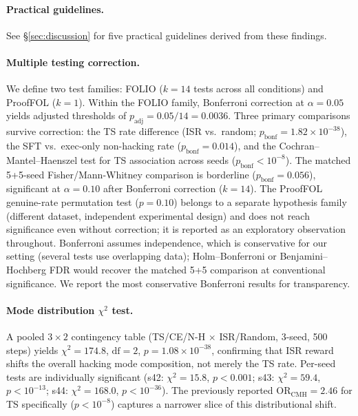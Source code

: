 \paragraph{Practical guidelines.}
\label{app:practical-guidelines}
See \S\ref{sec:discussion} for five practical guidelines derived from these findings.

\paragraph{Multiple testing correction.}
\label{app:statistical-details}
We define two test families: FOLIO ($k{=}14$ tests across all conditions) and ProofFOL ($k{=}1$).
Within the FOLIO family, Bonferroni correction at $\alpha{=}0.05$ yields adjusted thresholds of $p_{\text{adj}}{=}0.05/14{=}0.0036$.
Three primary comparisons survive correction: the TS rate difference (ISR vs.\ random; $p_{\text{bonf}}{=}1.82{\times}10^{-38}$), the SFT vs.\ exec-only non-hacking rate ($p_{\text{bonf}}{=}0.014$), and the Cochran--Mantel--Haenszel test for TS association across seeds ($p_{\text{bonf}}{<}10^{-8}$).
The matched 5+5-seed Fisher/Mann-Whitney comparison is borderline ($p_{\text{bonf}}{=}0.056$), significant at $\alpha{=}0.10$ after Bonferroni correction ($k{=}14$).
The ProofFOL genuine-rate permutation test ($p{=}0.10$) belongs to a separate hypothesis family (different dataset, independent experimental design) and does not reach significance even without correction; it is reported as an exploratory observation throughout.
Bonferroni assumes independence, which is conservative for our setting (several tests use overlapping data); Holm--Bonferroni or Benjamini--Hochberg FDR would recover the matched 5+5 comparison at conventional significance.
We report the most conservative Bonferroni results for transparency.

\paragraph{Mode distribution $\chi^2$ test.}
A pooled $3{\times}2$ contingency table (TS/CE/N-H $\times$ ISR/Random, 3-seed, 500 steps) yields $\chi^2{=}174.8$, $\text{df}{=}2$, $p{=}1.08{\times}10^{-38}$, confirming that ISR reward shifts the overall hacking mode composition, not merely the TS rate.
Per-seed tests are individually significant (s42: $\chi^2{=}15.8$, $p{<}0.001$; s43: $\chi^2{=}59.4$, $p{<}10^{-13}$; s44: $\chi^2{=}168.0$, $p{<}10^{-36}$).
The previously reported $\text{OR}_{\text{CMH}}{=}2.46$ for TS specifically ($p{<}10^{-8}$) captures a narrower slice of this distributional shift.


